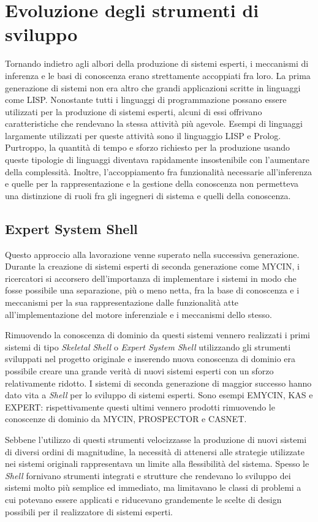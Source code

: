\section{Evoluzione degli strumenti di sviluppo}
Tornando indietro agli albori della produzione di sistemi esperti, i meccanismi di inferenza e le basi di conoscenza erano strettamente accoppiati fra loro. La prima generazione di sistemi non era altro che grandi applicazioni scritte in linguaggi come LISP. Nonostante tutti i linguaggi di programmazione possano essere utilizzati per la produzione di sistemi esperti, alcuni di essi offrivano caratteristiche che rendevano la stessa attività più agevole. Esempi di linguaggi largamente utilizzati per queste attività sono il linguaggio LISP e Prolog. Purtroppo, la quantità di tempo e sforzo richiesto per la produzione usando queste tipologie di linguaggi diventava rapidamente insostenibile con l'aumentare della complessità. Inoltre, l'accoppiamento fra funzionalità necessarie all'inferenza e quelle per la rappresentazione e la gestione della conoscenza non permetteva una distinzione di ruoli fra gli ingegneri di sistema e quelli della conoscenza.

\subsection{Expert System Shell}

Questo approccio alla lavorazione venne superato nella successiva generazione. Durante la creazione di sistemi esperti di seconda generazione come MYCIN, i ricercatori si accorsero dell'importanza di implementare i sistemi in modo che fosse possibile una separazione, più o meno netta, fra la base di conoscenza e i meccanismi per la sua rappresentazione dalle funzionalità atte all'implementazione del motore inferenziale e i meccanismi dello stesso.

Rimuovendo la conoscenza di dominio da questi sistemi vennero realizzati i primi sistemi di tipo \emph{Skeletal Shell} o \emph{Expert System Shell} utilizzando gli strumenti sviluppati nel progetto originale e inserendo nuova conoscenza di dominio era possibile creare una grande verità di nuovi sistemi esperti con un sforzo relativamente ridotto. I sistemi di seconda generazione di maggior successo hanno dato vita a \emph{Shell} per lo sviluppo di sistemi esperti. Sono esempi EMYCIN, KAS e EXPERT: rispettivamente questi ultimi vennero prodotti rimuovendo le conoscenze di dominio da MYCIN, PROSPECTOR e CASNET.

Sebbene l'utilizzo di questi strumenti velocizzasse la produzione di nuovi sistemi di diversi ordini di magnitudine, la necessità di attenersi alle strategie utilizzate nei sistemi originali rappresentava un limite alla flessibilità del sistema. Spesso le \emph{Shell} fornivano strumenti integrati e strutture che rendevano lo sviluppo dei sistemi molto più semplice ed immediato, ma limitavano le classi di problemi a cui potevano essere applicati e riducevano grandemente le scelte di design possibili per il realizzatore di sistemi esperti. \cite{development1993}


